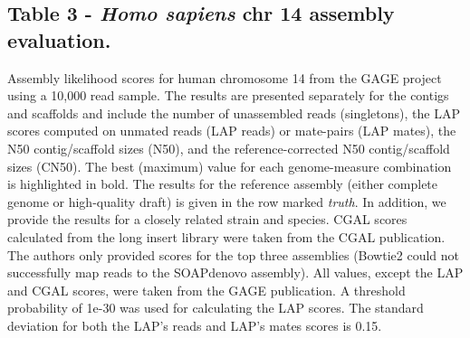 \subsection{Table 3 - \emph{Homo sapiens} chr 14 assembly evaluation.}
Assembly likelihood scores for human chromosome 14 from the GAGE project~\cite{earl2011assemblathon} using a 10,000 read sample.
The results are presented
separately for the contigs and scaffolds and include the number of
unassembled reads (singletons), the LAP scores computed on unmated reads (LAP reads) or
mate-pairs (LAP mates), the N50 contig/scaffold sizes (N50),
and the reference-corrected N50 contig/scaffold sizes (CN50).
The best (maximum) value for each
genome-measure combination is highlighted in bold.
The results for the reference
assembly (either complete genome or high-quality draft) is given in the row
marked \emph{truth}.  In addition, we
provide the results for a closely related strain and species.
CGAL scores calculated from the long insert library were taken from the CGAL publication.
The authors only provided scores for the top three assemblies (Bowtie2 could not successfully map reads to the SOAPdenovo assembly).
All values, except the LAP and CGAL scores, were taken from the
GAGE publication. A threshold probability of 1e-30 was used for calculating the LAP scores. The standard deviation for both the LAP's reads and LAP's mates scores is 0.15.

